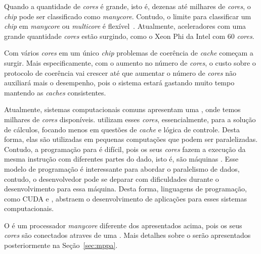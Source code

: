 Quando a quantidade de \textit{cores} é grande, isto é, dezenas até milhares de
\textit{cores}, o \textit{chip} pode ser classificado como \textit{manycore}.
Contudo, o limite para classificar um \textit{chip} em \textit{manycore} ou
\textit{multicore} é flexível~\cite{Tanenbaum2015}.
Atualmente, aceleradores com uma grande quantidade \textit{cores} estão
surgindo, como o Xeon Phi da Intel com 60 \textit{cores}.

Com vários \textit{cores} em um único \textit{chip} problemas de coerência de
\textit{cache} começam a surgir. Mais especificamente, com o aumento no número
de \textit{cores}, o custo sobre o protocolo de coerência vai crescer até que
aumentar o número de \textit{cores} não auxiliará mais o desempenho, pois o sistema
estará gastando muito tempo mantendo as \textit{caches} consistentes.


Atualmente, sistemas computacionais comuns apresentam uma \gpu, onde temos
milhares de \textit{cores} disponíveis. \gpus utilizam esses \textit{cores},
essencialmente, para a solução de cálculos, focando menos em questões de
\textit{cache} e lógica de controle. Desta forma, elas são utilizadas em
pequenas computações que podem ser paralelizadas. Contudo, a programação para
\gpus é difícil, pois os seus \textit{cores} fazem a execução da mesma instrução
com diferentes partes do dado, isto é, são máquinas \simd. Esse modelo de
programação é interessante para abordar o paralelismo de dados, contudo, o
desenvolvedor pode se deparar com dificuldades durante o desenvolvimento para
essa máquina. Desta forma, linguagens de programação, como CUDA e \opencl,
abstraem o desenvolvimento de aplicações para esses sistemas computacionais.

O \mppa é um processador \textit{manycore} diferente dos apresentados acima,
pois os seus \textit{cores} são conectados atraves de uma \noc. Mais detalhes
sobre o \mppa serão apresentados posteriormente na Seção~\ref{sec:mppa}.

